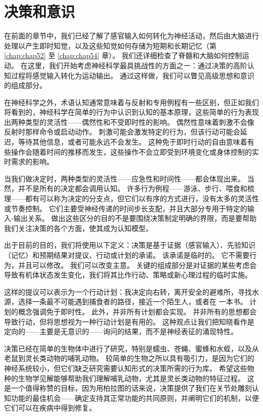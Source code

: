 \chapter{决策和意识} \label{chap:chap56}
在前面的章节中，我们已经了解了感官输入如何转化为神经活动，然后由大脑进行处理以产生即时知觉，以及这些知觉如何存储为短期和长期记忆（第 \ref{chap:chap52} 至 \ref{chap:chap54} 章）。
我们还详细检查了脊髓和大脑如何控制运动。
在这里，我们开始考虑神经科学最具挑战性的方面之一：通过决策的高阶认知过程将感觉输入转化为运动输出。
通过这样做，我们可以瞥见高级思想和意识的组成部分。


在神经科学之外，术语认知通常意味着与反射和专用例程有一些区别，但正如我们将看到的，神经科学在简单的行为中认识到认知的基本原理，这些简单的行为表现出两种类型的灵活性——偶然性和不受即时性的影响。
偶然性意味着刺激不会像反射时那样命令或启动动作。
刺激可能会激发特定的行为，但该行动可能会延迟，等待其他信息，或者可能永远不会发生。
这种免于即时行动的自由意味着有些操作会随着时间的推移而发生，这些操作不会立即受到环境变化或身体控制的实时需求的影响。


当我们做决定时，两种类型的灵活性——应急性和时间性——都会体现出来。
当然，并不是所有的决定都会调用认知。
许多行为例程——游泳、步行、喂食和梳理——都有可以称为决定的分支点，但它们以有序的方式进行，没有太多的灵活性或节奏控制。
它们主要受神经传递的时间步长支配，并且大部分专用于特定的输入-输出关系。
做出这些区分的目的不是要围绕决策制定明确的界限，而是要帮助我们关注决策的各个方面，使其成为认知模型。


出于目前的目的，我们将使用以下定义：决策是基于证据（感官输入）、先验知识（记忆）和预期结果对提议、行动或计划的承诺。
该承诺是临时的。
它不需要行为，并且可以修改。
我们可以改变主意。
关键的组成部分是对证据的某些考虑会导致有机体状态发生变化，我们将其比作行动、策略或新心理过程的临时实施。


这样的提议可以表示为一个行动计划：我决定向右转，离开安全的避难所，寻找水源，选择一条最不可能遇到捕食者的路径，接近一个陌生人，或者在 一本书。
计划的概念强调免于即时性。
此外，并非所有计划都会实现。 并非所有的思想都会导致行动，但将思想视为一种行动计划是有用的。
这种观点让我们把知晓看作是定向的——主要是无意识的——询问的结果，而不是神经表征的涌现特性。


决策已经在简单的生物体中进行了研究，特别是蠕虫、苍蝇、蜜蜂和水蛭，以及从老鼠到灵长类动物的哺乳动物。
较简单的生物之所以具有吸引力，是因为它们的神经系统较小，但它们缺乏研究需要认知形式的决策所需的行为库。
希望这些物种的生物学见解能够帮助我们理解哺乳动物，尤其是灵长类动物的特征过程。
这是一个值得称赞的目标，因为用柏拉图的话来说，决策提供了我们在关节处雕刻认知功能的最佳机会——确定支持其正常功能的共同原则，并阐明它们的机制，以便它们可以在疾病中得到修复。


